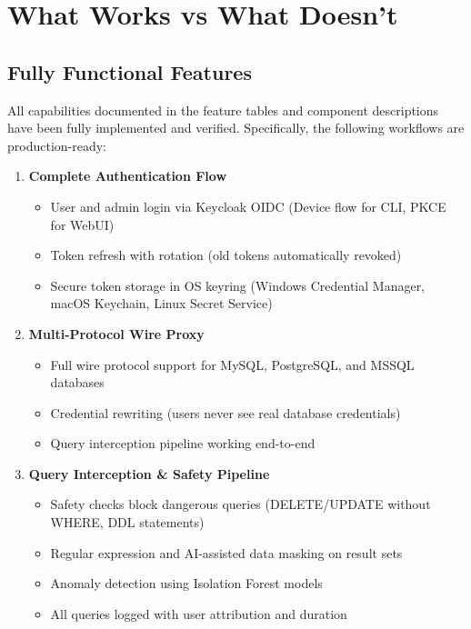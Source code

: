 \section{What Works vs What Doesn't}

\subsection{Fully Functional Features}

All capabilities documented in the feature tables and component descriptions have been fully implemented and verified. Specifically, the following workflows are production-ready:
\begin{enumerate}
    \item \textbf{Complete Authentication Flow}
    \begin{itemize}
        \item User and admin login via Keycloak OIDC (Device flow for CLI, PKCE for WebUI)
        \item Token refresh with rotation (old tokens automatically revoked)
        \item Secure token storage in OS keyring (Windows Credential Manager, macOS Keychain, Linux Secret Service)
    \end{itemize}
    
    \item \textbf{Multi-Protocol Wire Proxy}
    \begin{itemize}
        \item Full wire protocol support for MySQL, PostgreSQL, and MSSQL databases
        \item Credential rewriting (users never see real database credentials)
        \item Query interception pipeline working end-to-end
    \end{itemize}
    
    \item \textbf{Query Interception \& Safety Pipeline}
    \begin{itemize}
        \item Safety checks block dangerous queries (DELETE/UPDATE without WHERE, DDL statements)
        \item Regular expression and AI-assisted data masking on result sets
        \item Anomaly detection using Isolation Forest models
        \item All queries logged with user attribution and duration
    \end{itemize}
    

\end{enumerate}
